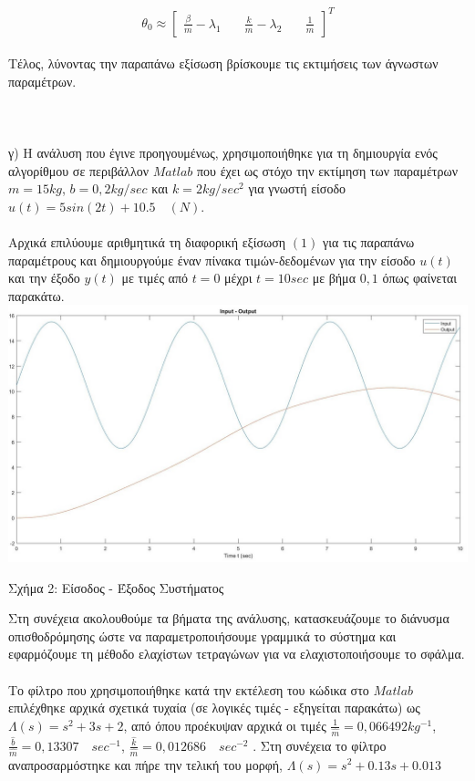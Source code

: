 \documentclass[12pt]{article}
\begin{document}
 \[ \theta_{0} \approx
 \begin{bmatrix}
		\frac{β}{m}-\lambda_{1} \quad &  \frac{k}{m}-\lambda_{2} \quad &  \frac{1}{m}
\end{bmatrix}^{T}\]
 \\
 Τέλος, λύνοντας την παραπάνω εξίσωση βρίσκουμε τις εκτιμήσεις των άγνωστων παραμέτρων.
\\
\\
\\
\\
γ) Η ανάλυση που έγινε προηγουμένως, χρησιμοποιήθηκε για τη δημιουργία ενός αλγορίθμου σε περιβάλλον $Matlab$ που έχει ως στόχο την εκτίμηση των παραμέτρων $m = 15kg$, $b = 0,2kg/sec$ και $k = 2kg/sec^2$ για γνωστή είσοδο $u(t) = 5 sin(2t) + 10.5 \quad(N)$.
\\
\\
Αρχικά επιλύουμε αριθμητικά τη διαφορική εξίσωση $(1)$ για τις παραπάνω \\ παραμέτρους και δημιουργούμε έναν πίνακα τιμών-δεδομένων για την είσοδο $u(t)$ και την έξοδο $y(t)$ με τιμές από $t=0$  μέχρι $t=10 sec$ με βήμα $0,1$ όπως φαίνεται παρακάτω.
\\
\includegraphics[width=\linewidth]{sys1_inp_out.jpg}
\centerline{Σχήμα 2: Είσοδος - Έξοδος Συστήματος}
\newline
\newline
\newline
Στη συνέχεια ακολουθούμε τα βήματα της ανάλυσης, κατασκευάζουμε το διάνυσμα οπισθοδρόμησης ώστε να παραμετροποιήσουμε γραμμικά το σύστημα και εφαρμόζουμε τη μέθοδο ελαχίστων τετραγώνων για να ελαχιστοποιήσουμε το σφάλμα.
\\
\\Το φίλτρο που χρησιμοποιήθηκε κατά την εκτέλεση του κώδικα στο $Matlab$ επιλέχθηκε αρχικά σχετικά τυχαία (σε λογικές τιμές - εξηγείται παρακάτω) ως $\Lambda(s)=s^{2}+3s+2$, από όπου προέκυψαν αρχικά οι τιμές $\frac{1}{\hat{m}} = 0,066492 kg^{-1}$, $\frac{\hat{b}}{\hat{m}} = 0,13307\quad sec^{-1}$, $\frac{\hat{k}}{\hat{m}} = 0,012686 \quad sec^{-2}$ . Στη συνέχεια το φίλτρο αναπροσαρμόστηκε και πήρε την τελική του μορφή, $\Lambda(s)=s^{2}+0.13s+0.013$ 
\end{document}
